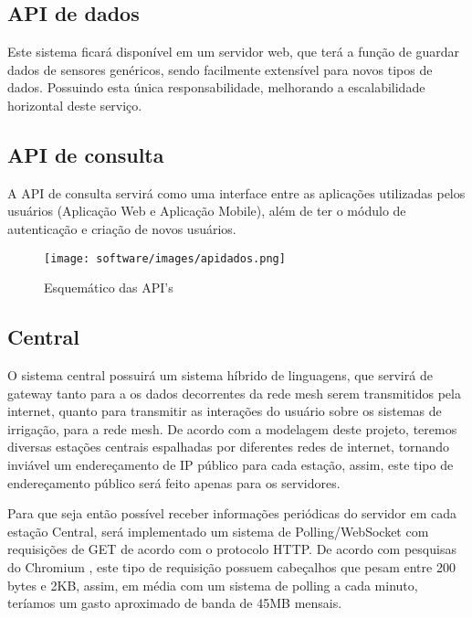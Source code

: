     \subsection{API de dados}

    Este sistema ficará disponível em um servidor web, que terá a função de guardar dados de sensores genéricos, sendo facilmente extensível para novos tipos de dados. Possuindo esta única responsabilidade, melhorando a escalabilidade horizontal deste serviço.

    \subsection{API de consulta}

    A API de consulta servirá como uma interface entre as aplicações utilizadas pelos usuários (Aplicação Web e Aplicação Mobile), além de ter o módulo de autenticação e criação de novos usuários.

    \begin{figure}[H]
    	\centering
        \texttt{[image: software/images/apidados.png]}
        \caption{Esquemático das API's}
        \label{fig:apidados}
    \end{figure}

    \subsection{Central}

    O sistema central possuirá um sistema híbrido de linguagens, que servirá de gateway  tanto para a os dados decorrentes da rede mesh serem transmitidos pela internet, quanto para transmitir as interações do usuário sobre os sistemas de irrigação, para a rede mesh. 
	De acordo com a modelagem deste projeto, teremos diversas estações centrais espalhadas por diferentes redes de internet, tornando inviável um endereçamento de IP público para cada estação, assim, este tipo de endereçamento público será feito apenas para os servidores.
    
    Para que seja então possível receber informações periódicas do servidor em cada estação Central, será implementado um sistema de Polling/WebSocket com requisições de GET de acordo com o protocolo HTTP. De acordo com pesquisas do Chromium \cite{chromium}, este tipo de requisição possuem cabeçalhos que pesam entre 200 bytes e 2KB, assim, em média com um sistema de polling a cada minuto, teríamos um gasto aproximado de banda de 45MB mensais.
    
